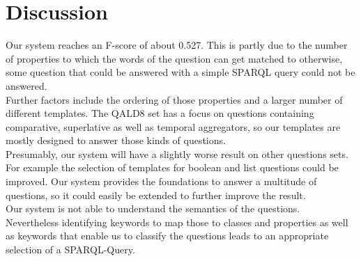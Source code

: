 \documentclass[runningheads]{llncs}
\begin{document}
\pagebreak
\section{Discussion} 
Our system reaches an F-score of about 0.527. This is partly due to the number of properties to which the words of the question can get matched to otherwise, some question that could be answered with a simple SPARQL query could not be answered. \\

Further factors include the ordering of those properties and a larger number of different templates. 
The QALD8 set has a focus on questions containing comparative, superlative as well as temporal aggregators, so our templates are mostly designed to answer those kinds of questions. \\

Presumably, our system will have a slightly worse result on other questions sets. For example the selection of templates for boolean and list questions could be improved.  Our system provides the foundations to answer a multitude of questions, so it could easily be extended to further improve the result.\\

Our system is not able to understand the semantics of the questions. \\
Nevertheless identifying keywords to map those to classes and properties as well as keywords that enable us to classify the questions leads to an appropriate selection of a SPARQL-Query.



%
%
%
% 
% 
%


\end{document}

